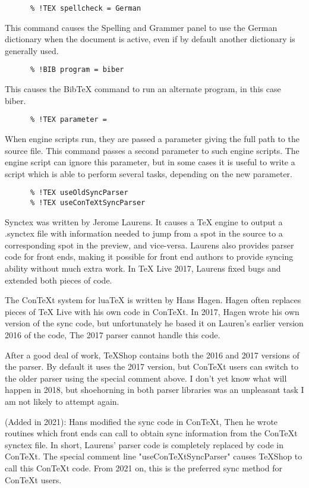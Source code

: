 \documentclass[11pt, oneside]{article}   	%
\begin{document}
  \begin{verbatim}
      % !TEX spellcheck = German
 \end{verbatim}
 This command causes the Spelling and Grammer panel to use the German dictionary when the document is active, even if by default another dictionary is generally used.
 
  \begin{verbatim}
      % !BIB program = biber
 \end{verbatim}
 This causes the BibTeX command to run an alternate program, in this case biber.    
  
  \begin{verbatim}
      % !TEX parameter = 
 \end{verbatim}
When engine scripts run, they are passed a parameter giving the full path to the source file. This command passes a second parameter to such engine scripts. The engine script can ignore this parameter, but in some cases it is useful to write a script which is able to perform several tasks, depending on the new parameter.  
     
  \begin{verbatim}
      % !TEX useOldSyncParser
      % !TEX useConTeXtSyncParser
 \end{verbatim}
Synctex was written by Jerome Laurens. It causes a TeX engine to output a .synctex file with information needed to jump from a spot in the source to a corresponding spot in the preview, and vice-versa. Laurens also provides parser code for front ends, making it possible for front end authors to provide syncing ability without much extra work. In TeX Live 2017, Laurens fixed bugs and extended both pieces of code.

The ConTeXt system for luaTeX is written by Hans Hagen. Hagen often replaces pieces of TeX Live with his own code in ConTeXt. In 2017, Hagen wrote his own version of the sync code, but unfortunately he based it on Lauren's earlier version 2016 of the code, The 2017 parser cannot handle this code.

After a good deal of work, TeXShop contains both the 2016 and 2017 versions of the parser. By default it uses the 2017 version, but ConTeXt users can switch to the older parser using the special comment above. I don't yet know what will happen in 2018, but shoehorning in both parser libraries was an unpleasant task I am not likely to attempt again.

(Added in 2021): Hans modified the sync code in ConTeXt, Then he wrote routines which front ends can call to obtain  sync information from the ConTeXt synctex file. In short, Laurens' parser code is completely replaced by code in ConTeXt. The special comment line "useConTeXtSyncParser" causes TeXShop to call this ConTeXt code. From 2021 on, this is the preferred sync method for ConTeXt users. 
\end{document}
